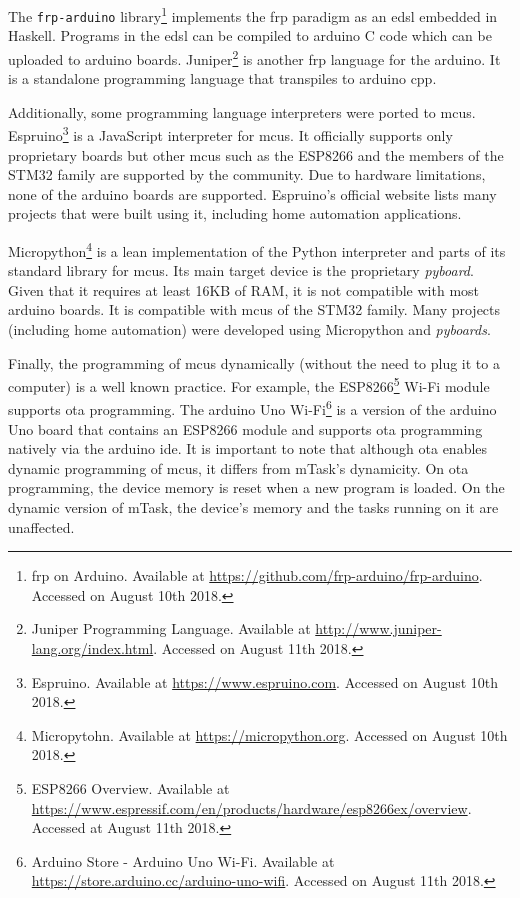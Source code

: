 The \texttt{frp-arduino} library\footnote{\acs{frp} on Arduino. Available at \url{https://github.com/frp-arduino/frp-arduino}. Accessed on August 10th 2018.} implements the \ac{frp} paradigm as an \ac{edsl} embedded in Haskell. Programs in the \ac{edsl} can be compiled to \gls{arduino} C code which can be uploaded to \gls{arduino} boards. Juniper\footnote{Juniper Programming Language. Available at \url{http://www.juniper-lang.org/index.html}. Accessed on August 11th 2018.} is another \ac{frp} language for the \gls{arduino}. It is a standalone programming language that transpiles to \gls{arduino} \gls{cpp}.

Additionally, some programming language interpreters were ported to \glspl{mcu}. Espruino\footnote{Espruino. Available at \url{https://www.espruino.com}. Accessed on August 10th 2018.} is a JavaScript interpreter for \glspl{mcu}. It officially supports only proprietary boards but other \glspl{mcu} such as the ESP8266 and the members of the STM32 family are supported by the community. Due to hardware limitations, none of the \gls{arduino} boards are supported. Espruino's official website lists many projects that were built using it, including home automation applications. 

Micropython\footnote{Micropytohn. Available at \url{https://micropython.org}. Accessed on August 10th 2018.} is a lean implementation of the Python interpreter and parts of its standard library for \glspl{mcu}. Its main target device is the proprietary \textit{pyboard}. Given that it requires at least 16KB of RAM, it is not compatible with most \gls{arduino} boards. It is compatible with \glspl{mcu} of the STM32 family. Many projects (including home automation) were developed using Micropython and \textit{pyboards}. 

Finally, the programming of \glspl{mcu} dynamically (without the need to plug it to a computer) is a well known practice. For example, the ESP8266\footnote{ESP8266 Overview. Available at \url{https://www.espressif.com/en/products/hardware/esp8266ex/overview}. Accessed at August 11th 2018.} Wi-Fi module supports \ac{ota} programming. The \gls{arduino} Uno Wi-Fi\footnote{Arduino Store - Arduino Uno Wi-Fi. Available at \url{https://store.arduino.cc/arduino-uno-wifi}. Accessed on August 11th 2018.} is a version of the \gls{arduino} Uno board that contains an ESP8266 module and supports \ac{ota} programming natively via the \gls{arduino} \acs{ide}. It is important to note that although \ac{ota} enables dynamic programming of \glspl{mcu}, it differs from \gls{mTask}'s dynamicity. On \ac{ota} programming, the device memory is reset when a new program is loaded. On the dynamic version of \gls{mTask}, the device's memory and the tasks running on it are unaffected.

